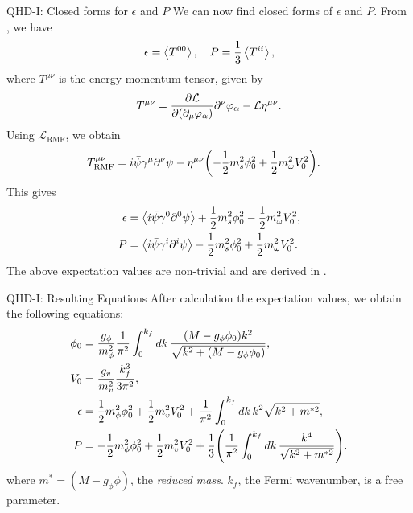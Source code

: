 \documentclass[handout]{beamer}
\newcommand{\Letter}[1]{\mathcal{#1}}
\newcommand{\Lag}{\Letter{L}}
\newcommand{\p}{\partial}
\begin{document}
    \begin{frame}{QHD-I: Closed forms for $\epsilon$ and $P$}
        \pause
        We can now find closed forms of $\epsilon$ and $P$. \pause From \autocite{diener_2008}, we have
        \[\epsilon = \expval{T^{00}}, \quad P = \frac{1}{3}\expval{T^{ii}},\]
        where $T^{\mu\nu}$ is the energy momentum tensor, given by
        \vspace{-5pt}
        \begin{align*}
            T^{\mu\nu} = \pdv{\Lag}{(\p_\mu \varphi_\alpha)}\p^\nu \varphi_\alpha - \Lag \eta^{\mu\nu}.
        \end{align*} \pause
        \vspace{-5pt}
        Using $\Lag_\text{RMF}$, we obtain
        \vspace{-5pt}
        \begin{align*}
            T^{\mu\nu}_\text{RMF} & =i\bar\psi\gamma^\mu \p^\nu \psi - \eta^{\mu\nu} \pqty{- \frac{1}{2} m_s^2 \phi_0^2 + \frac{1}{2} m_\omega^2 V_0^2}.
        \end{align*} \pause
        \vspace{-5pt}
        This gives
        \vspace{-15pt}
        \begin{align*}
            \epsilon & = \expval{i\bar\psi\gamma^0 \p^0 \psi} + \frac{1}{2} m_s^2 \phi_0^2 - \frac{1}{2} m_\omega^2 V_0^2,\\
            P & = \expval{i\bar\psi\gamma^i \p^i \psi}  - \frac{1}{2} m_s^2 \phi_0^2 + \frac{1}{2} m_\omega^2 V_0^2.
        \end{align*} \pause
        The above expectation values are non-trivial and are derived in \autocite{diener_2008}.
    \end{frame}

    \begin{frame}{QHD-I: Resulting Equations}
        \pause
        After calculation the expectation values, we obtain the following equations: \pause
        \begin{align*}
            \phi_0 &= \frac{g_\phi}{m_\phi^2} \frac{1}{\pi^2} \int_0^{k_f} \dd{k} \frac{(M-g_\phi \phi_0) k^2 }{\sqrt{k^2 + (M-g_\phi \phi_0)}},  \\
            V_0 &= \frac{g_v}{m_v^2} \frac{k_f^3}{3\pi^2}, \\
            \epsilon & = \frac{1}{2} m_\phi^2 \phi_0^2 + \frac{1}{2} m_v^2 V_0^2 + \frac{1}{\pi^2} \int_0^{k_f} \dd{k} k^2 \sqrt{k^2 + m^{*2}},\\
            P & = -\frac{1}{2} m_\phi^2 \phi_0^2 + \frac{1}{2} m_v^2 V_0^2 + \frac{1}{3} \pqty{\frac{1}{\pi^2} \int_0^{k_f} \dd{k}\frac{k^4}{\sqrt{k^2 + m^{*2}}}}.
        \end{align*}
        where $m^* = (M-g_\phi \phi)$, the \textit{reduced mass}. \pause $k_f$, the Fermi wavenumber, is a free parameter. 
    \end{frame}
\end{document}
